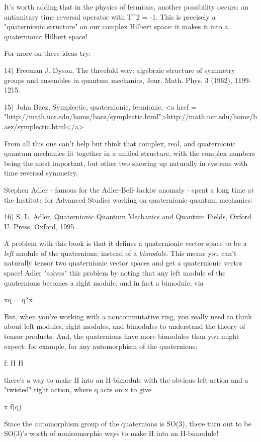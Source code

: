 It's worth adding that in the physics of fermions, another possibility
occurs: an antiunitary time reversal operator with T^{2} = -1.
This is precisely a "quaternionic structure" on our complex
Hilbert space: it makes it into a quaternionic Hilbert space!

For more on these ideas try:

14) Freeman J. Dyson, The threefold way: algebraic structure of 
symmetry groups and ensembles in quantum mechanics, Jour. Math. Phys. 3 
(1962), 1199-1215.

15) John Baez, Symplectic, quaternionic, fermionic, 
<a href = "http://math.ucr.edu/home/baez/symplectic.html">http://math.ucr.edu/home/baez/symplectic.html</a>

From all this one can't help but think that complex, real, and quaternionic
quantum mechanics fit together in a unified structure, with the complex
numbers being the most important, but other two showing up naturally
in systems with time reversal symmetry.  

Stephen Adler - famous for the Adler-Bell-Jackiw anomaly - spent 
a long time at the Institute for Advanced Studies working on 
quaternionic quantum mechanics:

16) S. L. Adler, Quaternionic Quantum Mechanics and Quantum Fields, 
Oxford U. Press, Oxford, 1995.

A problem with this book is that it defines a quaternionic vector
space to be a \emph{left} module of the quaternions, instead of a
\emph{bimodule}.  This means you can't naturally tensor two
quaternionic vector spaces and get a quaternionic vector space!  Adler
"solves" this problem by noting that any left module of the
quaternions becomes a right module, and in fact a bimodule, via

xq = q*x

But, when you're working with
a noncommutative ring, you really need to think about left modules,
right modules, and bimodules to understand the theory of tensor products.
And, the quaternions have more bimodules than you might expect: for
example, for any automorphism of the quaternions:

f: H \to  H 

there's a way to make H into an H-bimodule with the obvious left action 
and a "twisted" right action, where q acts on x to give

x f(q)

Since the automorphism 
group of the quaternions is SO(3), there turn out to be SO(3)'s worth of 
nonisomorphic ways to make H into an H-bimodule!

